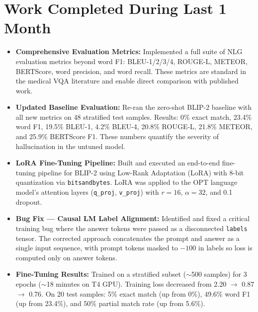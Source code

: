\documentclass[12pt,a4paper]{article}
\begin{document}
\section{Work Completed During Last 1 Month}
\begin{itemize}[leftmargin=*]
    \item \textbf{Comprehensive Evaluation Metrics:} Implemented a full suite of NLG evaluation metrics beyond word F1: BLEU-1/2/3/4, ROUGE-L, METEOR, BERTScore, word precision, and word recall. These metrics are standard in the medical VQA literature and enable direct comparison with published work.
    
    \item \textbf{Updated Baseline Evaluation:} Re-ran the zero-shot BLIP-2 baseline with all new metrics on 48 stratified test samples. Results: 0\% exact match, 23.4\% word F1, 19.5\% BLEU-1, 4.2\% BLEU-4, 20.8\% ROUGE-L, 21.8\% METEOR, and 25.9\% BERTScore F1. These numbers quantify the severity of hallucination in the untuned model.
    
    \item \textbf{LoRA Fine-Tuning Pipeline:} Built and executed an end-to-end fine-tuning pipeline for BLIP-2 using Low-Rank Adaptation (LoRA) with 8-bit quantization via \texttt{bitsandbytes}. LoRA was applied to the OPT language model's attention layers (\texttt{q\_proj}, \texttt{v\_proj}) with $r=16$, $\alpha=32$, and 0.1 dropout.
    
    \item \textbf{Bug Fix --- Causal LM Label Alignment:} Identified and fixed a critical training bug where the answer tokens were passed as a disconnected \texttt{labels} tensor. The corrected approach concatenates the prompt and answer as a single input sequence, with prompt tokens masked to $-100$ in labels so loss is computed only on answer tokens.
    
    \item \textbf{Fine-Tuning Results:} Trained on a stratified subset ($\sim$500 samples) for 3 epochs ($\sim$18 minutes on T4 GPU). Training loss decreased from 2.20 $\rightarrow$ 0.87 $\rightarrow$ 0.76. On 20 test samples: 5\% exact match (up from 0\%), 49.6\% word F1 (up from 23.4\%), and 50\% partial match rate (up from 5.6\%).
    

\end{itemize}
\end{document}

